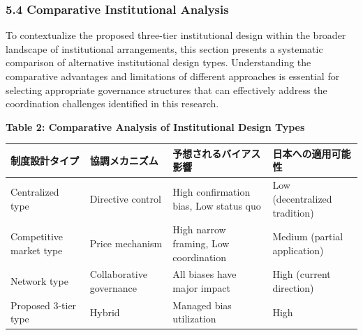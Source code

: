 \subsubsection{5.4 Comparative Institutional
Analysis}\label{comparative-institutional-analysis}

To contextualize the proposed three-tier institutional design within the
broader landscape of institutional arrangements, this section presents a
systematic comparison of alternative institutional design types.
Understanding the comparative advantages and limitations of different
approaches is essential for selecting appropriate governance structures
that can effectively address the coordination challenges identified in
this research.

\textbf{Table 2: Comparative Analysis of Institutional Design Types}

{\def\LTcaptype{none} %
\begin{longtable}[]{@{}
  >{\raggedright\arraybackslash}p{}
  >{\raggedright\arraybackslash}p{}
  >{\raggedright\arraybackslash}p{}
  >{\raggedright\arraybackslash}p{}@{}}
\toprule\noalign{}
\begin{minipage}[b]{\linewidth}\raggedright
制度設計タイプ
\end{minipage} & \begin{minipage}[b]{\linewidth}\raggedright
協調メカニズム
\end{minipage} & \begin{minipage}[b]{\linewidth}\raggedright
予想されるバイアス影響
\end{minipage} & \begin{minipage}[b]{\linewidth}\raggedright
日本への適用可能性
\end{minipage} \\
\midrule\noalign{}
\endhead
\bottomrule\noalign{}
\endlastfoot
Centralized type & Directive control & High confirmation bias, Low
status quo & Low (decentralized tradition) \\
Competitive market type & Price mechanism & High narrow framing, Low
coordination & Medium (partial application) \\
Network type & Collaborative governance & All biases have major impact &
High (current direction) \\
Proposed 3-tier type & Hybrid & Managed bias utilization & High \\
\end{longtable}
}


